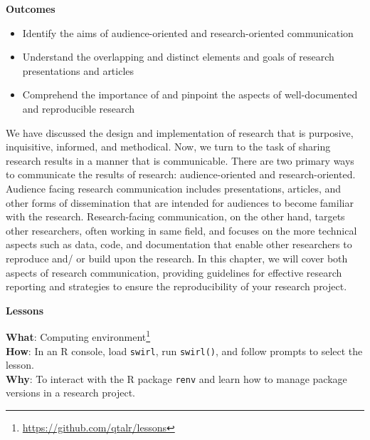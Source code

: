 \documentclass[
  letterpaper,
]{latex/krantz}
\providecommand{\tightlist}{%
  \setlength{\itemsep}{0pt}\setlength{\parskip}{0pt}}\usepackage{longtable,booktabs,array}
\theoremstyle{definition}
\theoremstyle{remark}
\DeclareRobustCommand{\href}[2]{#2\footnote{\url{#1}}}
\begin{document}
\begin{tcolorbox}[enhanced jigsaw, toprule=.15mm, breakable, colback=white, opacityback=0, leftrule=.75mm, bottomrule=.15mm, colframe=quarto-callout-color-frame, left=2mm, arc=.35mm, rightrule=.15mm]

\textbf{ Outcomes}

\begin{itemize}
\tightlist
\item
  Identify the aims of audience-oriented and research-oriented
  communication
\item
  Understand the overlapping and distinct elements and goals of research
  presentations and articles
\item
  Comprehend the importance of and pinpoint the aspects of
  well-documented and reproducible research
\end{itemize}

\end{tcolorbox}

We have discussed the design and implementation of research that is
purposive, inquisitive, informed, and methodical. Now, we turn to the
task of sharing research results in a manner that is communicable. There
are two primary ways to communicate the results of research:
audience-oriented and research-oriented. Audience facing research
communication includes presentations, articles, and other forms of
dissemination that are intended for audiences to become familiar with
the research. Research-facing communication, on the other hand, targets
other researchers, often working in same field, and focuses on the more
technical aspects such as data, code, and documentation that enable
other researchers to reproduce and/ or build upon the research. In this
chapter, we will cover both aspects of research communication, providing
guidelines for effective research reporting and strategies to ensure the
reproducibility of your research project.

\begin{tcolorbox}[enhanced jigsaw, toprule=.15mm, breakable, colback=white, opacityback=0, leftrule=.75mm, bottomrule=.15mm, colframe=quarto-callout-color-frame, left=2mm, arc=.35mm, rightrule=.15mm]

\textbf{ Lessons}

\textbf{What}: \href{https://github.com/qtalr/lessons}{Computing
environment}\\
\textbf{How}: In an R console, load \texttt{swirl}, run
\texttt{swirl()}, and follow prompts to select the lesson.\\
\textbf{Why}: To interact with the R package \texttt{renv} and learn how
to manage package versions in a research project.

\end{tcolorbox}
\end{document}
